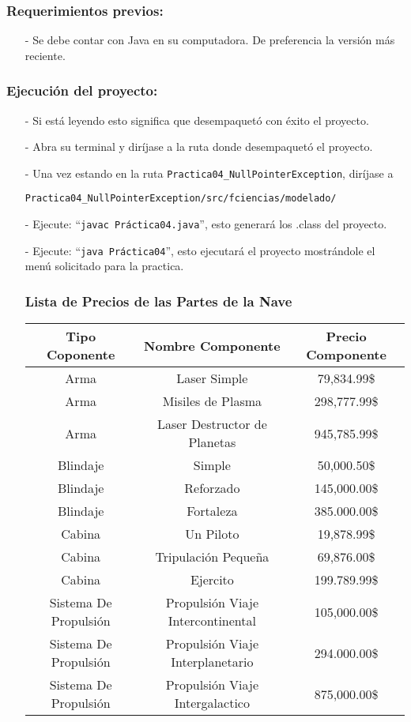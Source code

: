 \documentclass{article}
\newcommand{\code}[1]{\textcolor{white!25!black}{\texttt{#1}}}
\begin{document}
\subsubsection*{Requerimientos previos:}
\begin{itemize}
\item[-] Se debe contar con Java en su computadora. De preferencia la versión más reciente.
\end{itemize}

\subsubsection*{Ejecución del proyecto:}
\begin{itemize}
\item[-] Si está leyendo esto significa que desempaquetó con éxito el proyecto.
\item[-] Abra su terminal y diríjase a la ruta donde desempaquetó el proyecto.
\item[-] Una vez estando en la ruta \code{Practica04\_NullPointerException}, diríjase a

  \code{Practica04\_NullPointerException/src/fciencias/modelado/}
\item[-] Ejecute: “\code{javac Práctica04.java}”, esto generará los .class del proyecto.
\item[-] Ejecute: “\code{java Práctica04}”, esto ejecutará el proyecto mostrándole el menú solicitado para la practica.
\subsubsection{Lista de Precios de las Partes de la Nave}
\begin{table}[]
	\centering
	\begin{tabular}{|c|c|c|}
		\hline
		Tipo Coponente & Nombre Componente & Precio Componente \\ \hline
		Arma & Laser Simple & 79,834.99\$ \\ \hline
		Arma & Misiles de Plasma & 298,777.99\$ \\ \hline
		Arma & Laser Destructor de Planetas & 945,785.99\$ \\ \hline
		Blindaje & Simple & 50,000.50\$ \\ \hline
		Blindaje & Reforzado & 145,000.00\$ \\ \hline
		Blindaje & Fortaleza & 385.000.00\$ \\ \hline
		Cabina & Un Piloto & 19,878.99\$ \\ \hline
		Cabina & Tripulación Pequeña & 69,876.00\$ \\ \hline
		Cabina & Ejercito & 199.789.99\$ \\ \hline
		Sistema De Propulsión & Propulsión Viaje Intercontinental & 105,000.00\$ \\ \hline
		Sistema De Propulsión & Propulsión Viaje Interplanetario & 294.000.00\$ \\ \hline
		Sistema De Propulsión & Propulsión Viaje Intergalactico & 875,000.00\$ \\ \hline
	\end{tabular}
\end{table}
\end{itemize}
\end{document}
